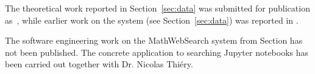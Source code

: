 The theoretical work reported in Section~\ref{sec:data} was submitted for publication as~\cite{CarFarKohRab:bmobb19}, while earlier work on the \dmh system (see Section~\ref{sec:data}) was reported in \cite{BerKohRab:tumdi19}.

The software engineering work on the MathWebSearch system from Section has not been published. The concrete application to searching Jupyter notebooks has been carried out together with Dr. Nicolas Thi\'ery.


